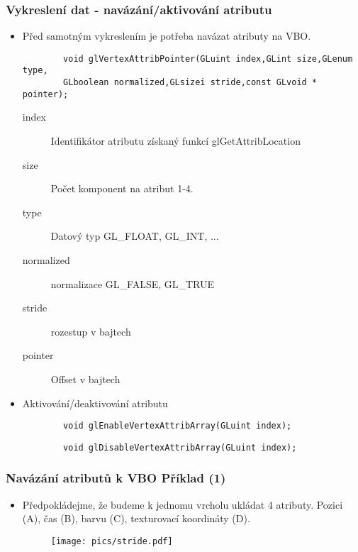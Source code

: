 \begin{frame}[fragile]
\frametitle{Vykreslení dat - navázání/aktivování atributu}
	\begin{itemize}
		\item{Před samotným vykreslením je potřeba navázat atributy na VBO.
		{\scriptsize
		\begin{verbatim}
		void glVertexAttribPointer(GLuint index,GLint size,GLenum type,
		GLboolean normalized,GLsizei stride,const GLvoid * pointer);
		\end{verbatim}
		}
		\begin{description}
		\item[index] Identifikátor atributu získaný funkcí {\color{blue} glGetAttribLocation}
		\item[size] Počet komponent na atribut 1-4.
		\item[type] Datový typ GL\_FLOAT, GL\_INT, ...
		\item[normalized] normalizace GL\_FALSE, GL\_TRUE
		\item[stride] rozestup v bajtech
		\item[pointer] Offset v bajtech
		\end{description}
		}
		\item{Aktivování/deaktivování atributu
		{\scriptsize
		\begin{verbatim}
		void glEnableVertexAttribArray(GLuint index);
		\end{verbatim}
		}
		{\scriptsize
		\begin{verbatim}
		void glDisableVertexAttribArray(GLuint index);
		\end{verbatim}
		}}
	\end{itemize}
\end{frame}

\begin{frame}[fragile]
\frametitle{Navázání atributů k VBO Příklad (1)}
	\begin{itemize}
		\item{Předpokládejme, že budeme k jednomu vrcholu ukládat 4 atributy.
		Pozici (A), čas (B), barvu (C), texturovací koordináty (D).
		\begin{figure}[h]
		\texttt{[image: pics/stride.pdf]}
		\end{figure}
		}
	\end{itemize}
\end{frame}


